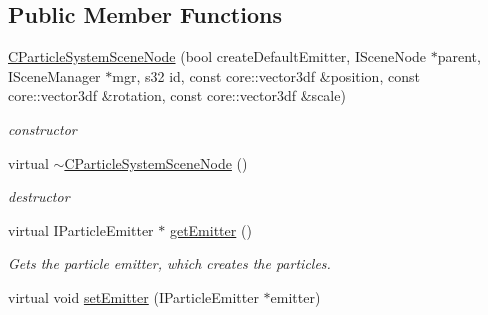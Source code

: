 \subsection*{Public Member Functions}
\begin{DoxyCompactItemize}
\item 
\hypertarget{classirr_1_1scene_1_1_c_particle_system_scene_node_a8bf14f1811713bd25fa10946588d646f}{\hyperlink{classirr_1_1scene_1_1_c_particle_system_scene_node_a8bf14f1811713bd25fa10946588d646f}{C\-Particle\-System\-Scene\-Node} (bool create\-Default\-Emitter, I\-Scene\-Node $\ast$parent, I\-Scene\-Manager $\ast$mgr, s32 id, const core\-::vector3df \&position, const core\-::vector3df \&rotation, const core\-::vector3df \&scale)}\label{classirr_1_1scene_1_1_c_particle_system_scene_node_a8bf14f1811713bd25fa10946588d646f}

\begin{DoxyCompactList}\small\item\em constructor \end{DoxyCompactList}\item 
\hypertarget{classirr_1_1scene_1_1_c_particle_system_scene_node_a6af8c07ade103607574c241baf08979f}{virtual \hyperlink{classirr_1_1scene_1_1_c_particle_system_scene_node_a6af8c07ade103607574c241baf08979f}{$\sim$\-C\-Particle\-System\-Scene\-Node} ()}\label{classirr_1_1scene_1_1_c_particle_system_scene_node_a6af8c07ade103607574c241baf08979f}

\begin{DoxyCompactList}\small\item\em destructor \end{DoxyCompactList}\item 
\hypertarget{classirr_1_1scene_1_1_c_particle_system_scene_node_a7e50a0d9fb0c5f28d648d285c57c7a67}{virtual I\-Particle\-Emitter $\ast$ \hyperlink{classirr_1_1scene_1_1_c_particle_system_scene_node_a7e50a0d9fb0c5f28d648d285c57c7a67}{get\-Emitter} ()}\label{classirr_1_1scene_1_1_c_particle_system_scene_node_a7e50a0d9fb0c5f28d648d285c57c7a67}

\begin{DoxyCompactList}\small\item\em Gets the particle emitter, which creates the particles. \end{DoxyCompactList}\item 
\hypertarget{classirr_1_1scene_1_1_c_particle_system_scene_node_aa3c0c809a5f6d4a02aa2e2240aceec55}{virtual void \hyperlink{classirr_1_1scene_1_1_c_particle_system_scene_node_aa3c0c809a5f6d4a02aa2e2240aceec55}{set\-Emitter} (I\-Particle\-Emitter $\ast$emitter)}\label{classirr_1_1scene_1_1_c_particle_system_scene_node_aa3c0c809a5f6d4a02aa2e2240aceec55}


\end{DoxyCompactItemize}

